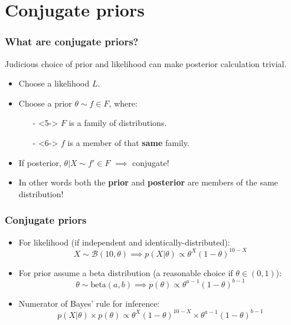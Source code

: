 \documentclass[handout]{beamer}
\begin{document}
\section{Conjugate priors}
\frame{\tableofcontents[currentsection]}

\begin{frame}
	\frametitle{What are conjugate priors?}
	
	Judicious choice of prior and likelihood can make posterior calculation trivial.
	
	\begin{itemize}
		\item<3-> Choose a likelihood $L$.
		\item<4-> Choose a prior $\theta\sim f\in F$, where:
		\begin{itemize}
			\item[-]<5-> $F$ is a family of distributions.
			\item[-]<6-> $f$ is a member of that \textbf{same} family.
		\end{itemize}
		\item<7-> If posterior, $\theta|X\sim f'\in F$ $\implies$ conjugate!
		\item<8-> In other words both the \textbf{prior} and \textbf{posterior} are members of the same distribution!
	\end{itemize}
	
\end{frame}

\begin{frame}
	\frametitle{Conjugate priors}
	
	\begin{itemize}
		\item<3-> For likelihood (if independent and identically-distributed):
		\onslide<4-> 
		\begin{equation}
		X \sim \mathcal{B}(10,\theta)\implies p(X|\theta)\propto \theta^X (1-\theta)^{10-X}
		\end{equation}
		\item<5-> For prior assume a beta distribution (a reasonable choice if $\theta\in(0,1)$):
		\onslide<6->
		\begin{equation}
		\theta\sim \text{beta}(a,b) \implies p(\theta) \propto \theta^{a-1}(1-\theta)^{b-1}
		\end{equation}
		\item<7-> Numerator of Bayes' rule for inference: 
		\onslide<8->
		\begin{equation}
		p(X|\theta)\times p(\theta) \propto \theta^X (1-\theta)^{10-X} \times \theta^{a-1}(1-\theta)^{b-1}
		\end{equation}
	\end{itemize}
\end{frame}
\end{document}
